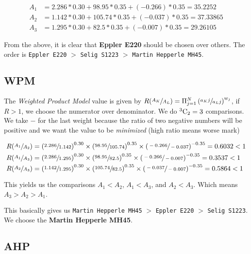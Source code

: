 \begin{align*}
    A_1 &= 2.286 * 0.30 + 98.95 * 0.35 + (-0.266) * 0.35 = 35.2252 \\
    A_2 &= 1.142 * 0.30 + 105.74 * 0.35 + (-0.037) * 0.35 = 37.33865 \\
    A_3 &= 1.295 * 0.30 + 82.5 * 0.35 + (-0.007) * 0.35 = 29.26105
\end{align*}

From the above, it is clear that \textbf{Eppler E220} should be chosen over others. The order is \texttt{Eppler E220} $>$ \texttt{Selig S1223} $>$ \texttt{Martin Hepperle MH45}.

\subsection{WPM}

The \emph{Weighted Product Model} value is given by $R(\sfrac{A_K}{A_L}) = \Pi_{j=1}^{N} \left ( \sfrac{a_Kj}{a_Lj} \right )^{w_j}$, if $R > 1$, we choose the numerator over denominator. We do $^3\textup{C}_2 = 3$ comparisons. We take $-$ for the last weight because the ratio of two negative numbers will be positive and we want the value to be \emph{minimized} (high ratio means worse mark)

\begin{align*}
    R(\sfrac{A_1}{A_2}) &= \left ( \sfrac{2.286}{1.142} \right )^{0.30} \times \left ( \sfrac{98.95}{105.74} \right )^{0.35} \times \left ( \sfrac{-0.266}{-0.037} \right )^{-0.35} = 0.6032 < 1 \\
    R(\sfrac{A_1}{A_3}) &= \left ( \sfrac{2.286}{1.295} \right )^{0.30} \times \left ( \sfrac{98.95}{82.5} \right )^{0.35} \times \left ( \sfrac{-0.266}{-0.007} \right )^{-0.35} = 0.3537 < 1 \\
    R(\sfrac{A_2}{A_3}) &= \left ( \sfrac{1.142}{1.295} \right )^{0.30} \times \left ( \sfrac{105.74}{82.5} \right )^{0.35} \times \left ( \sfrac{-0.037}{-0.007} \right )^{-0.35} = 0.5864 < 1
\end{align*}

This yields us the comparisons $A_1 < A_2$, $A_1 < A_3$, and $A_2 < A_3$. Which means $A_3 > A_2 > A_1$.

This basically gives us  \texttt{Martin Hepperle MH45} $>$ \texttt{Eppler E220} $>$ \texttt{Selig S1223}. We choose the \textbf{Martin Hepperle MH45}.

\subsection{AHP}

